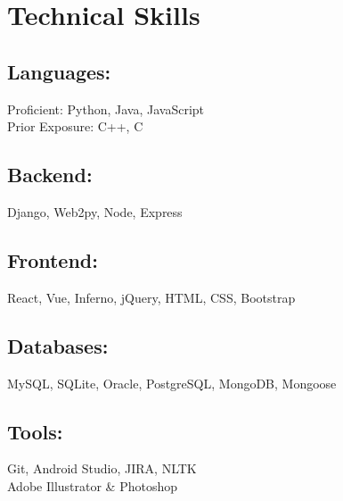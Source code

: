 \documentclass[]{hieudo-build}
\begin{document}
\begin{minipage}[t]{0.3\textwidth} 

\section{Technical Skills}
\begin{flushleft}
\narrower
\subsection{Languages:}
\normalsize
  Proficient: Python, Java, JavaScript
  \smallskip \\
  Prior Exposure: C++, C

\subsection{Backend:}
\normalsize
  Django, Web2py, Node, Express

\subsection{Frontend:}
\normalsize
  React, Vue, Inferno,
  jQuery, HTML, CSS, Bootstrap

\subsection{Databases:}
\normalsize
  MySQL, SQLite, Oracle,
  PostgreSQL, MongoDB, Mongoose

\subsection{Tools:}
\normalsize
  Git, Android Studio, JIRA, NLTK \\
  Adobe Illustrator \& Photoshop
\end{flushleft}
\sectionsep



\end{minipage}
\end{document}
